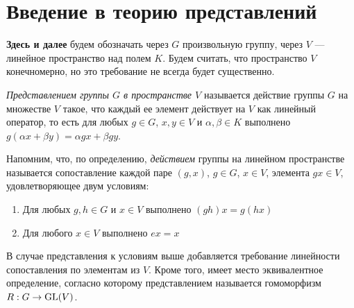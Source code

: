 \section{Введение в теорию представлений}

\textbf{Здесь и далее} будем обозначать через $G$ произвольную группу, через $V$ --- линейное пространство над полем $K$. Будем считать, что пространство $V$ конечномерно, но это требование не всегда будет существенно.

\begin{definition}
	\textit{Представлением группы $G$ в пространстве $V$} называется действие группы $G$ на множестве $V$ такое, что каждый ее элемент действует на $V$ как линейный оператор, то есть для любых $g \in G$,  $x, y \in V$ и $\alpha, \beta \in K$ выполнено $g(\alpha x + \beta y) = \alpha gx + \beta gy$.
\end{definition}

\begin{note}
	Напомним, что, по определению, \textit{действием} группы на линейном пространстве называется сопоставление каждой паре $(g, x)$, $g \in G$, $x \in V$, элемента $gx \in V$, удовлетворяющее двум условиям:
	\begin{enumerate}
		\item Для любых $g, h \in G$ и $x \in V$ выполнено $(gh)x = g(hx)$
		\item Для любого $x \in V$ выполнено $ex = x$
	\end{enumerate}
\end{note}

В случае представления к условиям выше добавляется требование линейности сопоставления по элементам из $V$. Кроме того, имеет место эквивалентное определение, согласно которому представлением называется гомоморфизм $R : G \to \operatorname{GL}(V)$.


